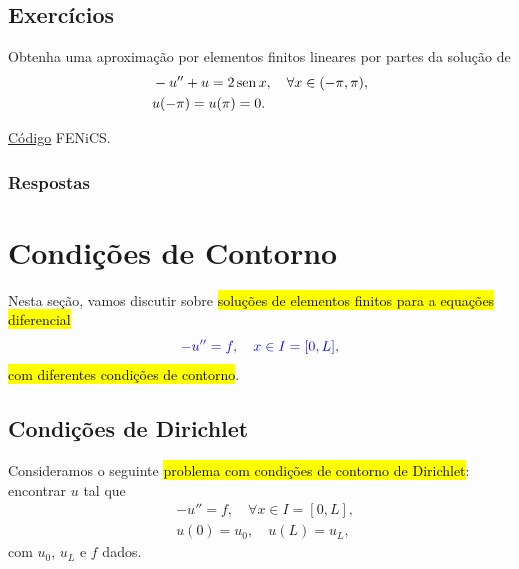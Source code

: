 \subsection{Exercícios}
\badgeRevisar

\begin{exer}\label{exer:dc}
  Obtenha uma aproximação por elementos finitos lineares por partes da solução de
  \begin{align}
    &-u'' + u = 2\operatorname{sen} x,\quad \forall x\in (-\pi, \pi),\\
    &u(-\pi)=u(\pi)=0.
  \end{align}
\end{exer}
\begin{resp}
  \ifispython
  \href{https://github.com/phkonzen/notas/blob/master/src/MetodoElementosFinitos/cap_mef1d/dados/exer_dc/exer_dc.py}{Código} FENiCS.
  \fi
\end{resp}

\subsubsection{Respostas}

\shipoutAnswer


\section{Condições de Contorno}\label{cap_mef1d_sec_cc}
\badgeRevisar

Nesta seção, vamos discutir sobre \hl{soluções de elementos finitos para a equações diferencial}
\begin{equation}\color{blue}-u'' = f,\quad x\in I=[0, L],
\end{equation}
\hl{com diferentes condições de contorno}.

\subsection{Condições de Dirichlet}
\badgeRevisar

Consideramos o seguinte \hl{problema com condições de contorno de Dirichlet}{\dirichlet}: encontrar $u$ tal que
\begin{align}
  &-u'' = f,\quad \forall x\in I=[0, L],\label{eq:cc_d_eq}\\
  &u(0) = u_0,\quad u(L) = u_L,\label{eq:cc_d_bc}
\end{align}
com $u_0$, $u_L$ e $f$ dados.

